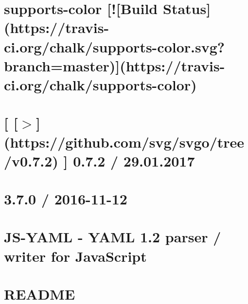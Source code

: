 \documentclass[twoside]{book}
\newcommand{\+}{\discretionary{\mbox{\scriptsize$\hookleftarrow$}}{}{}}
\begin{document}
\chapter{supports-\/color \mbox{[}!\mbox{[}Build Status\mbox{]}(https\+://travis-\/ci.org/chalk/supports-\/color.svg?branch=master)\mbox{]}(https\+://travis-\/ci.org/chalk/supports-\/color)}
\label{md__c_1_workspace_demo_src_main_script_node_modules_supports-color_readme}

\chapter{\mbox{[} \mbox{[}$>$\mbox{]}(https\+://github.com/svg/svgo/tree/v0.7.2) \mbox{]} 0.7.2 / 29.01.2017}
\label{md__c_1_workspace_demo_src_main_script_node_modules_svgo__c_h_a_n_g_e_l_o_g}

\chapter{3.7.0 / 2016-\/11-\/12}
\label{md__c_1_workspace_demo_src_main_script_node_modules_svgo_node_modules_js-yaml__c_h_a_n_g_e_l_o_g}

\chapter{J\+S-\/\+Y\+A\+ML -\/ Y\+A\+ML 1.2 parser / writer for Java\+Script}
\label{md__c_1_workspace_demo_src_main_script_node_modules_svgo_node_modules_js-yaml__r_e_a_d_m_e}

\chapter{R\+E\+A\+D\+ME}
\label{md__c_1_workspace_demo_src_main_script_node_modules_svgo__r_e_a_d_m_e}

\end{document}
